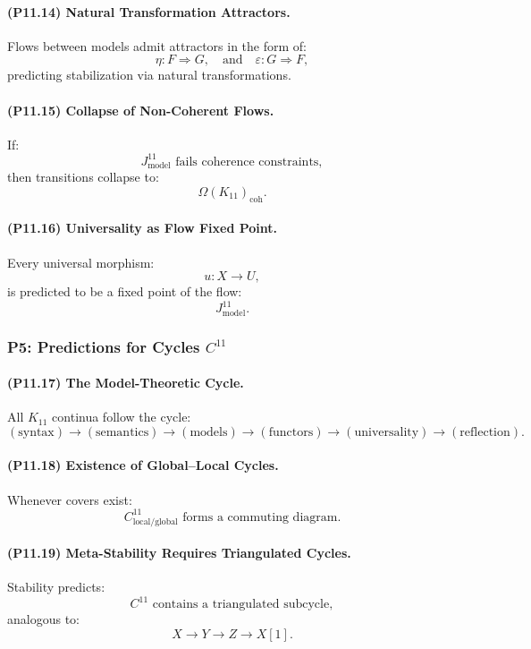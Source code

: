 \paragraph{(P11.14) Natural Transformation Attractors.}
Flows between models admit attractors in the form of:
\[
\eta: F \Rightarrow G,
\quad\text{and}\quad
\varepsilon: G \Rightarrow F,
\]
predicting stabilization via natural transformations.

\paragraph{(P11.15) Collapse of Non-Coherent Flows.}
If:
\[
J_{\mathrm{model}}^{11}
\text{ fails coherence constraints},
\]
then transitions collapse to:
\[
\Omega(K_{11})_{\mathrm{coh}}.
\]

\paragraph{(P11.16) Universality as Flow Fixed Point.}
Every universal morphism:
\[
u: X \to U,
\]
is predicted to be a fixed point of the flow:
\[
J_{\mathrm{model}}^{11}.
\]

\subsubsection{P5: Predictions for Cycles $C^{11}$}

\paragraph{(P11.17) The Model-Theoretic Cycle.}
All $K_{11}$ continua follow the cycle:
\[
(\text{syntax}) \to (\text{semantics}) 
\to (\text{models}) \to (\text{functors})
\to (\text{universality}) \to (\text{reflection}).
\]

\paragraph{(P11.18) Existence of Global–Local Cycles.}
Whenever covers exist:
\[
C_{\mathrm{local/global}}^{11}
\text{ forms a commuting diagram.}
\]

\paragraph{(P11.19) Meta-Stability Requires Triangulated Cycles.}
Stability predicts:
\[
C^{11} \text{ contains a triangulated subcycle},
\]
analogous to:
\[
X \to Y \to Z \to X[1].
\]

